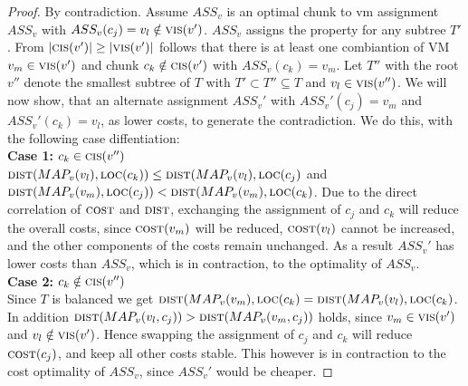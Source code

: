 \documentclass[9pt,twocolumn]{scrartcl}
\newcommand{\Chunk}{\ensuremath{c}}
\newcommand{\VmChunkAssignment}{\ensuremath{ASS_v}}
\newcommand{\NodeMapping}{\ensuremath{MAP_v}}
\newcommand{\ChunkLocation}{\ensuremath{\textsc{loc}}}
\newcommand{\VirtualNode}{\ensuremath{v}}
\newcommand{\SubstrateNode}{\ensuremath{v}}
\newcommand{\Tree}{\ensuremath{T}}
\begin{document}
\begin{proof}
 By contradiction. Assume $\VmChunkAssignment$ is an optimal chunk to vm
assignment $\VmChunkAssignment$ with $\VmChunkAssignment(\Chunk_j)
=\VirtualNode_l \notin \VmCount(\SubstrateNode')$. $\VmChunkAssignment$ assigns
the property for any subtree $\Tree'$. From $|\ChunkCount(\SubstrateNode')|
\geq
|\VmCount(\SubstrateNode')|$ follows that there is at least one
combiantion of
VM
$\VirtualNode_m \in \VmCount(\SubstrateNode')$ and chunk $\Chunk_k \notin
\ChunkCount(\SubstrateNode')$ with $\VmChunkAssignment(\Chunk_k) =
\VirtualNode_m$. Let $\Tree''$ with the root $\SubstrateNode''$ denote the
smallest subtree of $\Tree$ with $\Tree' \subset \Tree'' \subseteq \Tree$ and
$\VirtualNode_l \in \VmCount(\SubstrateNode'')$. We will now show, that an
alternate assignment $\VmChunkAssignment'$ with
$\VmChunkAssignment'(\Chunk_j) = \VirtualNode_m$ and
$\VmChunkAssignment'(\Chunk_k) = \VirtualNode_l$, as lower costs, to generate
the contradiction. We do this, with the following case diffentiation:
\\
\textbf{Case 1:} $\Chunk_k \in \ChunkCount(\SubstrateNode'')$\\
$\Distance(\NodeMapping(\VirtualNode_l), \ChunkLocation(\Chunk_k)) \leq
\Distance(\NodeMapping(\VirtualNode_l), \ChunkLocation(\Chunk_j)$ and
$\Distance(\NodeMapping(\VirtualNode_m), \ChunkLocation(\Chunk_j)) <
\Distance(\NodeMapping(\VirtualNode_m), \ChunkLocation(\Chunk_k)$. Due to the
direct correlation of $\textsc{cost}$ and $\textsc{dist}$, exchanging the
assignment of $\Chunk_j$ and $\Chunk_k$ will reduce the overall costs, since
$\CostPerChunk(\VirtualNode_m)$ will be reduced,
$\CostPerChunk(\VirtualNode_l)$ cannot be increased, and the other components
of the costs remain unchanged. As a result $\VmChunkAssignment'$ has lower
costs than $\VmChunkAssignment$, which is in contraction, to the optimality of
$\VmChunkAssignment$.\\
\textbf{Case 2:} $\Chunk_k \notin \ChunkCount(\SubstrateNode'')$\\
Since $\Tree$ is balanced we get $\Distance(\NodeMapping(\VirtualNode_m),
\ChunkLocation(\Chunk_k)  = \Distance(\NodeMapping(\VirtualNode_l),
\ChunkLocation(\Chunk_k)$. In addition $\Distance(\NodeMapping(\VirtualNode_l,
\Chunk_j)) > \Distance(\NodeMapping(\VirtualNode_m,
\Chunk_j)) $ holds, since $\VirtualNode_m \in \VmCount(\SubstrateNode')$ and
$\VirtualNode_l \notin
\VmCount(\SubstrateNode')$. Hence swapping the assignment of $\Chunk_j$ and
$\Chunk_k$ will reduce $\CostPerChunk(\Chunk_j)$, and keep all other costs
stable. This however is in contraction to the cost optimality of
$\VmChunkAssignment$, since $\VmChunkAssignment'$ would be cheaper.
\end{proof}
\end{document}
